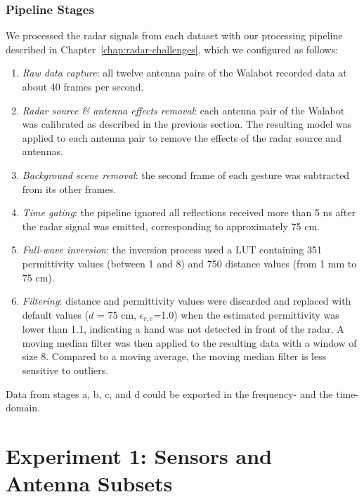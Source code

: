 \subsubsection{Pipeline Stages}
We processed the radar signals from each dataset with our processing pipeline described in Chapter~\ref{chap:radar-challenges}, which we configured as follows: 
\begin{enumerate}[label=(\alph*)]
    \item \textit{Raw data capture}: all twelve antenna pairs of the Walabot recorded data at about 40 frames per second.
    \item \textit{Radar source \& antenna effects removal}: each antenna pair of the Walabot was calibrated as described in the previous section. The resulting model was applied to each antenna pair to remove the effects of the radar source and antennas.
    \item \textit{Background scene removal}: the second frame of each gesture was subtracted from its other frames.
    \item \textit{Time gating}: the pipeline ignored all reflections received more than 5 ns after the radar signal was emitted, corresponding to approximately 75 cm.
    \item \textit{Full-wave inversion}: the inversion process used a LUT containing 351 permittivity values (between 1 and 8) and 750 distance values (from 1 mm to 75 cm).
    \item \textit{Filtering}: distance and permittivity values were discarded and replaced with default values ($d$ = 75 cm, $\epsilon_{r,e}$=1.0) when the estimated permittivity was lower than 1.1, indicating a hand was not detected in front of the radar. A moving median filter was then applied to the resulting data with a window of size 8. Compared to a moving average, the moving median filter is less sensitive to outliers.
\end{enumerate}
Data from stages a, b, c, and d could be exported in the frequency- and the time-domain.


\section{Experiment 1: Sensors and Antenna Subsets} \label{sec:radar-experiments:sensors}
